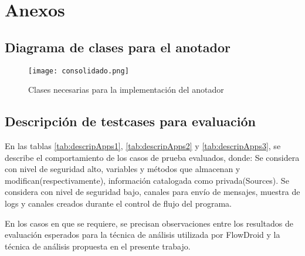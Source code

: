\label{ch:anexos}
\chapter{Anexos}

\section{Diagrama de clases para el anotador}
\label{sec:diagramaClass}
\begin{figure}[H]
	\texttt{[image: consolidado.png]}
	\caption{Clases necesarias para la implementación del anotador}
	\label{fig:classDiagram} 
\end{figure}

\section{Descripción de testcases para evaluación}
\label{tb:muestra-descripApps}
\label{sec:testcases}
En las tablas \ref{tab:descripApps1}, \ref{tab:descripApps2} y
\ref{tab:descripApps3}, se describe el comportamiento de los casos de prueba
evaluados, donde:\newline 
Se considera con nivel de seguridad alto, variables y métodos que almacenan y
modifican(respectivamente), información catalogada como privada(Sources).\newline 
Se considera con nivel de seguridad bajo, canales para envío de mensajes,
muestra de logs y canales creados durante el control de flujo del programa.

En los casos en que se requiere, se precisan observaciones entre los
resultados de evaluación esperados para la técnica de análisis utilizada por
FlowDroid y la técnica de análisis propuesta en el presente trabajo.

